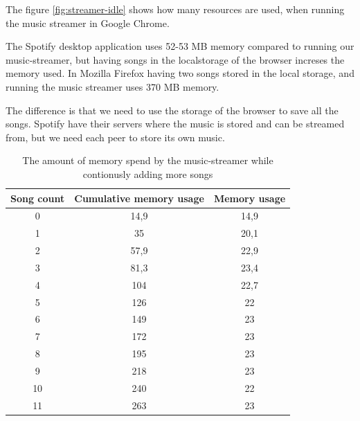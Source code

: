 The figure \ref{fig:streamer-idle} shows how many resources are used,
when running the music streamer in Google Chrome.

The Spotify desktop application uses 52-53 MB memory compared to running our music-streamer,
but having songs in the localstorage of the browser increses the memory used. 
In Mozilla Firefox having two songs stored in the local storage,
and running the music streamer uses 370 MB memory.

The difference is that we need to use the storage of the browser to save all the songs.
Spotify have their servers where the music is stored and can be streamed from,
but we need each peer to store its own music.

\begin{table}[]
\centering
\begin{tabular}{|c|c|c|} \hline
Song count & Cumulative memory usage & Memory usage \\ \hline
0  & 14,9 & 14,9 \\
1  & 35   & 20,1 \\
2  & 57,9 & 22,9 \\
3  & 81,3 & 23,4 \\
4  & 104  & 22,7 \\
5  & 126  & 22   \\
6  & 149  & 23   \\
7  & 172  & 23   \\
8  & 195  & 23   \\
9  & 218  & 23   \\
10 & 240  & 22   \\
11 & 263  & 23   \\ \hline
\end{tabular}
\caption{The amount of memory spend by the music-streamer while contionusly adding more songs}
\label{tab_memUsage}
\end{table}

